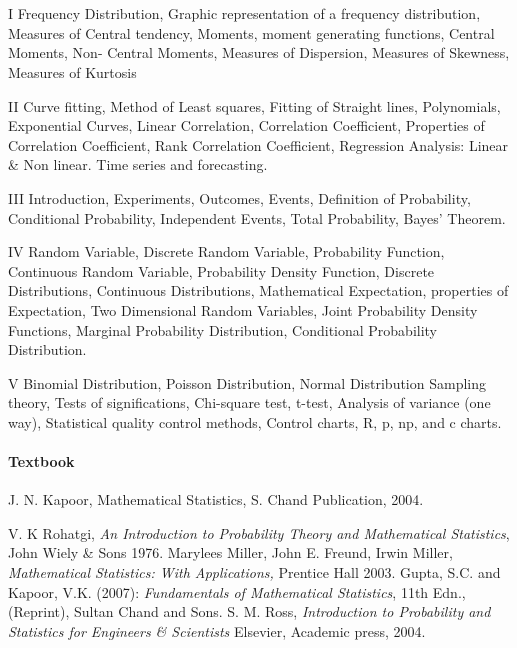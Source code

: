 \section{\courseinfo}

\unit{I}
Frequency Distribution, Graphic representation of a frequency distribution, Measures of Central tendency, Moments, moment generating functions, Central Moments, Non- Central Moments, Measures of Dispersion, Measures of Skewness, Measures of Kurtosis 

\unit{II}
Curve fitting, Method of Least squares, Fitting of Straight lines, Polynomials, Exponential Curves, Linear Correlation, Correlation Coefficient, Properties of Correlation Coefficient, Rank Correlation Coefficient, Regression Analysis: Linear \& Non linear. Time series and forecasting.

\unit{III}
Introduction, Experiments, Outcomes, Events, Definition of Probability, Conditional Probability, Independent Events, Total Probability, Bayes' Theorem.

\unit{IV}
Random Variable, Discrete Random Variable, Probability Function, Continuous Random Variable, Probability Density Function, Discrete Distributions, Continuous Distributions, Mathematical Expectation, properties of Expectation, Two Dimensional Random Variables, Joint Probability Density Functions, Marginal Probability Distribution, Conditional Probability Distribution.

\unit{V}
Binomial Distribution, Poisson Distribution, Normal Distribution
Sampling theory, Tests of significations, Chi-square test, t-test, Analysis of variance (one way), 
Statistical quality control methods, Control charts, R, p, np, and c charts.

\paragraph{Textbook}
J. N. Kapoor, Mathematical Statistics, S. Chand Publication, 2004.
\begin{thebibliography}{}
\let\clearpage\relax
{}     V. K Rohatgi, \emph{An Introduction to Probability Theory and Mathematical Statistics}, John Wiely \& Sons 1976.
     Marylees Miller, John E. Freund, Irwin Miller, \emph{Mathematical Statistics: With Applications,} Prentice Hall 2003.
 Gupta, S.C. and Kapoor, V.K. (2007): \emph{Fundamentals of Mathematical Statistics}, 11th  Edn.,(Reprint), Sultan Chand and Sons.
 S. M. Ross, \emph{Introduction to Probability and Statistics for Engineers \& Scientists} Elsevier, Academic press, 2004.

\end{thebibliography}













